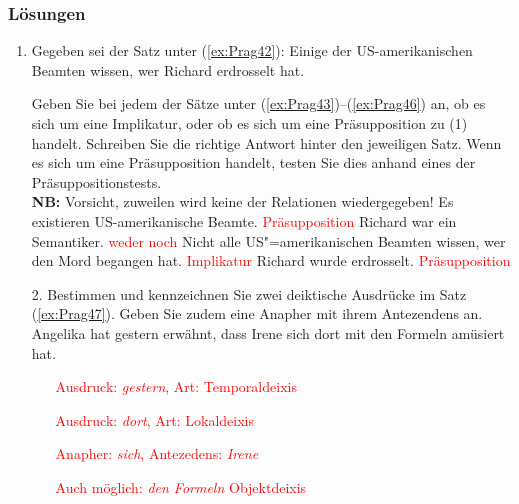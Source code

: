 	{
	\begin{frame}[shrink]
	\frametitle{Lösungen}
	
	\begin{enumerate}
		\item Gegeben sei der Satz unter (\ref{ex:Prag42}):
		\ea \label{ex:Prag42}
		Einige der US-amerikanischen Beamten wissen, wer Richard erdrosselt hat.
		\z
		\item [] Geben Sie bei jedem der Sätze unter (\ref{ex:Prag43})--(\ref{ex:Prag46}) an, ob es sich um eine Implikatur, oder ob es sich um eine Präsupposition zu (1) handelt. Schreiben Sie die richtige Antwort hinter den jeweiligen Satz. Wenn es sich um eine Präsupposition handelt, testen Sie dies anhand eines der Präsuppositionstests. \\
		\textbf{NB:} Vorsicht, zuweilen wird keine der Relationen wiedergegeben!
		\ea\label{ex:Prag43} Es existieren US-amerikanische Beamte. \textcolor{red}{\ras Präsupposition}
		\ex\label{ex:Prag44} Richard war ein Semantiker. \textcolor{red}{\ras weder noch}
		\ex\label{ex:Prag45} Nicht alle US"=amerikanischen Beamten wissen, wer den Mord begangen hat. \textcolor{red}{\ras Implikatur}
		\ex\label{ex:Prag46} Richard wurde erdrosselt. \textcolor{red}{\ras Präsupposition}
		\z	
	\end{enumerate}
	
\end{frame}


\begin{frame}
\begin{enumerate}
\item[2.] Bestimmen und kennzeichnen Sie zwei deiktische Ausdrücke im Satz (\ref{ex:Prag47}). Geben Sie zudem eine Anapher mit ihrem Antezendens an.
\ea\label{ex:Prag47} Angelika hat gestern erwähnt, dass Irene sich dort mit den Formeln amüsiert hat.
\z 


\begin{itemize}
	\item[] \textcolor{red}{Ausdruck: \emph{gestern}, Art: Temporaldeixis}
	\item[] \textcolor{red}{Ausdruck: \emph{dort}, Art: Lokaldeixis}
	\item[] \textcolor{red}{Anapher: \emph{sich}, Antezedens: \emph{Irene}}
	\item[] \textcolor{red}{Auch möglich: \emph{den Formeln} \ras Objektdeixis}
\end{itemize}


\end{enumerate}
\end{frame}}
